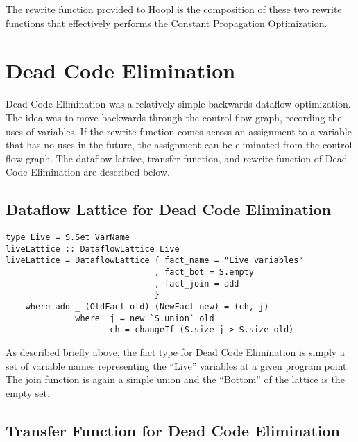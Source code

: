 \documentclass[11pt]{article}
\begin{document}
The rewrite function provided to Hoopl is the composition of these two rewrite functions that effectively performs the Constant Propagation Optimization. 

\section {Dead Code Elimination} 
\label{sec:deadcode}

Dead Code Elimination was a relatively simple backwards dataflow optimization. The idea was to move backwards through the control flow graph, recording the uses of variables. If the rewrite function comes across an assignment to a variable that has no uses in the future, the assignment can be eliminated from the control flow graph. The dataflow lattice, transfer function, and rewrite function of Dead Code Elimination are described below. 

\subsection { Dataflow Lattice for Dead Code Elimination }

\begin{verbatim}
type Live = S.Set VarName 
liveLattice :: DataflowLattice Live 
liveLattice = DataflowLattice { fact_name = "Live variables"
                              , fact_bot = S.empty 
                              , fact_join = add
                              } 
    where add _ (OldFact old) (NewFact new) = (ch, j)
              where  j = new `S.union` old
                     ch = changeIf (S.size j > S.size old) 
\end{verbatim}

As described briefly above, the fact type for Dead Code Elimination is simply a set of variable names representing the ``Live'' variables at a given program point. The join function is again a simple union and the ``Bottom'' of the lattice is the empty set. 

\subsection { Transfer Function for Dead Code Elimination}
\end{document}
